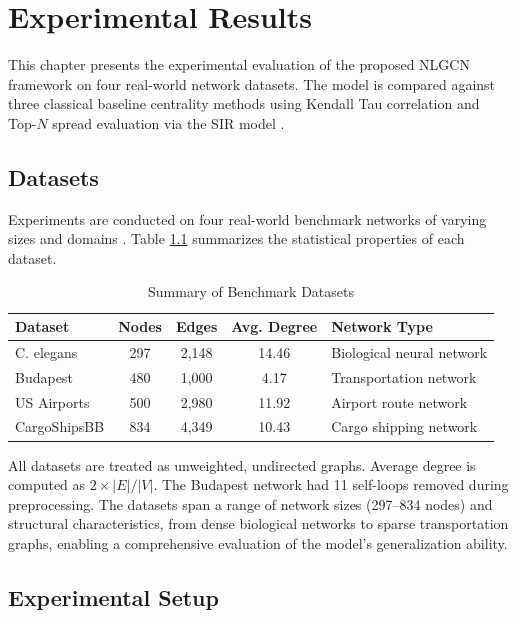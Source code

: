 \chapter{Experimental Results}

This chapter presents the experimental evaluation of the proposed NLGCN
framework on four real-world network datasets. The model is compared
against three classical baseline centrality methods using Kendall Tau
correlation and Top-$N$ spread evaluation via the SIR
model \cite{ chen2012}.

\section{Datasets}

Experiments are conducted on four real-world benchmark networks of
varying sizes and domains \cite{hafiene2020, farooq2018}. Table
\ref{tab:datasets} summarizes the statistical properties of each
dataset.

\begin{table}[h]
\centering
\caption{Summary of Benchmark Datasets}
\label{tab:datasets}
\begin{tabular}{|l|c|c|c|l|}
\hline
\textbf{Dataset} & \textbf{Nodes} & \textbf{Edges} &
\textbf{Avg. Degree} & \textbf{Network Type} \\
\hline
C. elegans    & 297 & 2{,}148 & 14.46 & Biological neural network \\
Budapest      & 480 & 1{,}000 &  4.17 & Transportation network \\
US Airports   & 500 & 2{,}980 & 11.92 & Airport route network \\
CargoShipsBB  & 834 & 4{,}349 & 10.43 & Cargo shipping network \\
\hline
\end{tabular}
\end{table}

All datasets are treated as unweighted, undirected graphs. Average
degree is computed as $2 \times |E| / |V|$. The Budapest network had
11 self-loops removed during preprocessing. The datasets span a range
of network sizes (297--834 nodes) and structural characteristics,
from dense biological networks to sparse transportation graphs, enabling
a comprehensive evaluation of the model's generalization ability.

\section{Experimental Setup}

